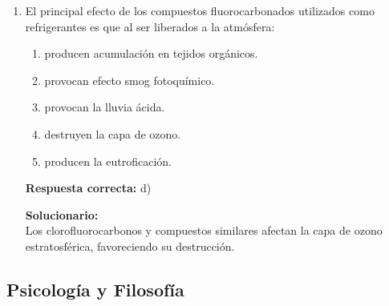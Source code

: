 \begin{enumerate}
	\item El principal efecto de los compuestos fluorocarbonados utilizados como refrigerantes es que al ser liberados a la atmósfera:
	\begin{enumerate}[label=\alph*)]
		\item producen acumulación en tejidos orgánicos.
		\item provocan efecto smog fotoquímico.
		\item provocan la lluvia ácida.
		\item destruyen la capa de ozono.
		\item producen la eutroficación.
	\end{enumerate}
	\textbf{Respuesta correcta:} d)
	
	\vspace{2mm}
	\textbf{Solucionario:}\\
	Los clorofluorocarbonos y compuestos similares afectan la capa de ozono estratosférica, favoreciendo su destrucción.
	
	\vspace{6mm}
	
\end{enumerate}

\subsection*{Psicología y Filosofía}


